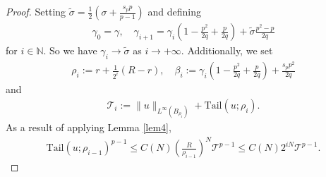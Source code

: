 \documentclass[10pt,a4paper]{amsart}
\begin{document}
\begin{proof}
	Setting $\tilde{\sigma}=\frac{1}{2}\left(\sigma+\frac{s_p p}{p-1}\right)$ and defining
	\begin{align*}
		\gamma_0=\gamma,\quad \gamma_{i+1}=\gamma_i\left(1-\frac{p^2}{2 q}+\frac{p}{2 q}\right)+\tilde{\sigma}  \frac{p^2-p}{2 q}
	\end{align*}
	for $i\in\mathbb{N}$. So we have $\gamma_i\rightarrow\tilde{\sigma}$ as $i\rightarrow+\infty$. Additionally, we set
	\begin{align*}
		\rho_i:=r+\frac{1}{2^i}(R-r), \quad \beta_i:=\gamma_i\left(1-\frac{p^2}{2 q}+\frac{p}{2 q}\right)+\frac{s_p p^2}{2 q}
	\end{align*}
	and 
	\begin{align*}
		\mathcal{T}_i:=\|u\|_{L^{\infty}\left(B_{\rho_i}\right)}+\mathrm{Tail} \left(u ; \rho_i\right) .
	\end{align*}
	As a result of applying Lemma \ref{lem4},
	\begin{align}\label{12.1}
		\mathrm { Tail }\left(u ; \rho_{i-1}\right)^{p-1} \leq C(N)\left(\frac{R}{\rho_{i-1}}\right)^N \mathcal{T}^{p-1} \leq C(N)  2^{i N} \mathcal{T}^{p-1}.
	\end{align}


\end{proof}
\end{document}

